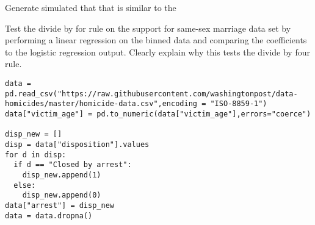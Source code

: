 







\begin{exercise}[]
Generate simulated that that is similar to the 
\end{exercise}


\begin{exercise}
Test the divide by for rule on the support for same-sex marriage data set by performing a linear regression on the binned data and comparing the coefficients to the logistic regression output. Clearly explain why this tests the divide by four rule.
\end{exercise}


\begin{exercise}

\begin{Verbatim}
data = pd.read_csv("https://raw.githubusercontent.com/washingtonpost/data-homicides/master/homicide-data.csv",encoding = "ISO-8859-1")
data["victim_age"] = pd.to_numeric(data["victim_age"],errors="coerce")

disp_new = []
disp = data["disposition"].values
for d in disp:
  if d == "Closed by arrest":
    disp_new.append(1)
  else:
    disp_new.append(0)
data["arrest"] = disp_new
data = data.dropna()
\end{Verbatim}
\end{exercise}


